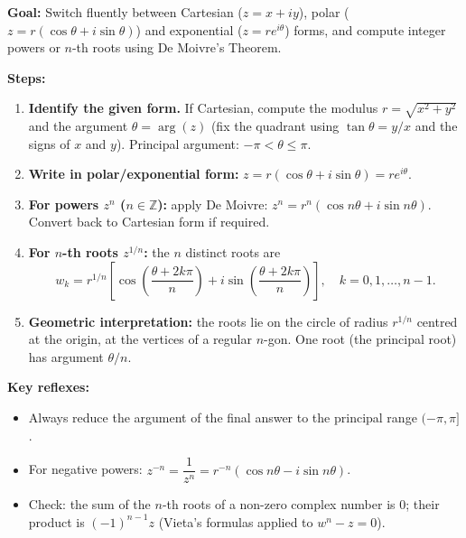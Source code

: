 \documentclass[11pt]{article}
\begin{document}
\begin{methode}
\textbf{Goal:} Switch fluently between Cartesian ($z=x+iy$), polar ($z=r(\cos\theta+i\sin\theta)$) and exponential ($z=re^{i\theta}$) forms, and compute integer powers or $n$-th roots using De Moivre's Theorem.

\textbf{Steps:}
\begin{enumerate}
    \item \textbf{Identify the given form.} If Cartesian, compute the modulus $r=\sqrt{x^2+y^2}$ and the argument $\theta=\arg(z)$ (fix the quadrant using $\tan\theta=y/x$ and the signs of $x$ and $y$). Principal argument: $-\pi < \theta \le \pi$.
    \item \textbf{Write in polar/exponential form:} $z=r(\cos\theta+i\sin\theta)=re^{i\theta}$.
    \item \textbf{For powers $z^n$ ($n\in\mathbb{Z}$):} apply De Moivre: $z^n = r^n(\cos n\theta + i\sin n\theta)$. Convert back to Cartesian form if required.
    \item \textbf{For $n$-th roots $z^{1/n}$:} the $n$ distinct roots are
    \[
    w_k = r^{1/n}\left[\cos\left(\frac{\theta+2k\pi}{n}\right) + i\sin\left(\frac{\theta+2k\pi}{n}\right)\right],\quad k=0,1,\dots,n-1.
    \]
    \item \textbf{Geometric interpretation:} the roots lie on the circle of radius $r^{1/n}$ centred at the origin, at the vertices of a regular $n$-gon. One root (the principal root) has argument $\theta/n$.
\end{enumerate}

\textbf{Key reflexes:}
\begin{itemize}
    \item Always reduce the argument of the final answer to the principal range $(-\pi,\pi]$.
    \item For negative powers: $z^{-n} = \dfrac{1}{z^n} = r^{-n}(\cos n\theta - i\sin n\theta)$.
    \item Check: the sum of the $n$-th roots of a non-zero complex number is $0$; their product is $(-1)^{n-1}z$ (Vieta's formulas applied to $w^n - z = 0$).
\end{itemize}
\end{methode}
\end{document}
